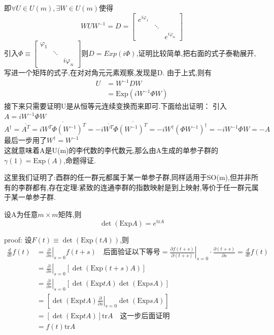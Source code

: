 \documentclass[../main.tex]{subfiles}
\begin{document}
即$\forall U \in U(m),\exists W \in U(m)$使得
$$WUW^{-1} = D = \begin{bmatrix}
    e^{i\varphi_1}&&\\
    &\ddots &\\
    &&e^{i\varphi_{n}}
\end{bmatrix}$$
引入$\Phi \equiv \begin{bmatrix}
    \varphi_1&&\\
    &\ddots &\\
    &&i\varphi_{n}
\end{bmatrix}$则$D = Exp(i\Phi)$,证明比较简单,把右面的式子泰勒展开,写进一个矩阵的式子,在对对角元元素观察,发现是D.
由于上式,则有
\begin{align*}
    U&=W^{-1}DW\\
     &=\text{Exp}(iW^{-1}\Phi W)
\end{align*}
接下来只需要证明U是从恒等元连续变换而来即可.下面给出证明：
引入$A = iW^{-1}\Phi W$
$$A^\dagger = \overline{A^T} = \overline{iW^T \Phi (W^{-1})^T} = -i \overline{W^T} \Phi \overline{(W^{-1})^T} = -iW^\dagger (\Phi W^{-1})^{\dagger} = -iW^{-1}\Phi W = -A$$
最后一步用了$W^\dagger = W^{-1}$\\
这就意味着A是U(m)的李代数的李代数元,那么由A生成的单参子群的$\gamma(1) = \text{Exp}(A)$,命题得证.
\begin{note}
    这里我们证明了:酉群的任一群元都属于某一单参子群,同样适用于SO(m),但并非所有的李群都有,存在定理:紧致的连通李群的指数映射是到上映射,等价于任一群元属于某一单参子群.
\end{note}
\begin{lemma}
    设A为任意$m\times m$矩阵,则
    $$\det(\text{Exp}A) = e^{\text{tr} A}$$
\end{lemma}
proof: 设$F(t) \equiv \det(\text{Exp}(tA))$,则
\begin{align*}
    \frac{d}{dt}f(t) &= \left.\frac{\partial}{\partial s}\right|_{s=0}f(t+s)\quad\text{后面验证以下等号} = \left.\frac{\partial f(t + s)}{\partial (t +s)}\right|_{s=0}\cdot \frac{\partial (t+s)}{\partial s} = \frac{d}{dt}f(t)\\
    &=\left.\frac{\partial}{\partial s}\right|_{s=0}[\det(\text{Exp}(t+s)A)]\\
    &=\left.\frac{\partial}{\partial s}\right|_{s=0}[\det(\text{Exp}tA)\det(\text{Exp}sA)]\\
    &=[\det(\text{Exp}tA)\left.\frac{\partial}{\partial s}\right|_{s=0}\det(\text{Exp}sA)]\\
    &=[\det(\text{Exp}tA)]\text{tr}A\quad \text{这一步后面证明}\\
    &=f(t)\text{tr}A
\end{align*}
\end{document}
